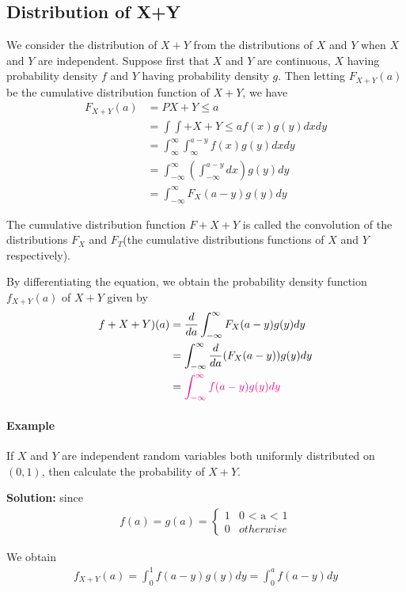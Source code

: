 \documentclass[10 pt,final]{article}
\newcommand{\impo}[1]{{\color{magenta} #1}}
\begin{document}
\subsection{\impo{Distribution of X+Y}}
We consider the distribution of $X+Y$ from the distributions of $X$ and $Y$ when $X$ and $Y$ are independent. Suppose first that $X$ and $Y$ are continuous, $X$ having probability density $f$ and $Y$ having probability density $g$. Then letting $F_{X+Y}(a)$ be the cumulative distribution function of $X+Y$, we have
\begin{align*}
F_{X+Y}(a) & = P{X+Y \leq a} \\
& = \int \int+{X+ Y \leq a} f(x)g(y) dx dy \\
& = \int_{\infty}^\infty \int_\infty^{a-y} f(x) g(y) dxdy \\
& = \int_{-\infty}^\infty (\int_{-\infty}^{a-y}dx) g(y)dy \\
& = \int_{-\infty}^\infty F_X(a-y) g(y)dy
\end{align*}

The cumulative distribution function $F+{X+Y}$ is called the \impo{convolution} of the distributions $F_X$ and $F_T$(the cumulative distributions functions of $X$ and $Y$ respectively).

By differentiating the equation, we obtain the probability density function $f_{X+Y} (a)$ of $X+Y$ given by
\begin{align*}
f+{X+Y})(a) & = \frac{d}{da} \int_{-\infty}^\infty F_X(a-y) g(y) dy \\
& = \int_{-\infty}^\infty \frac{d}{da} (F_X(a-y))g(y)dy \\
& = \impo{ \int_{-\infty}^\infty f(a-y) g(y) dy}
\end{align*}


\paragraph{Example} If $X$ and $Y$ are independent random variables both uniformly distributed on $(0,1)$, then calculate the probability of $X+Y$.

\textbf{Solution:} since 
\begin{align*}
f(a) = g(a) =
\begin{cases}
1 & \mbox{0 < a < 1} \\
0 & otherwise
\end{cases}
\end{align*}

We obtain
\impo{
\begin{align*}
f_{X+Y}(a) =\int_0^1 f(a-y)g(y)dy =  \int_0^a f(a-y)dy 
\end{align*}
}
\end{document}
